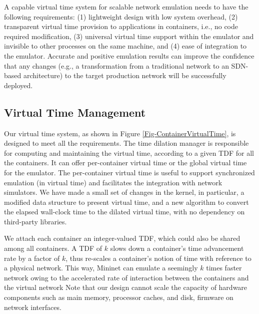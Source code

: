A capable virtual time system for scalable network emulation needs to have the following requirements: (1) lightweight design with low system overhead, (2) transparent virtual time provision to applications in containers, i.e., no code required modification,  (3) universal virtual time support within the emulator and invisible to other processes on the same machine, and (4) ease of integration to the emulator. Accurate and positive emulation results can improve the confidence that any changes (e.g., a transformation from a traditional network to an SDN-based architecture) to the target production network will be successfully deployed. 

\begin{figure*}
\centering
{}
\caption{\textbf{Architecture of the Virtual Time System in a Container-based Network Emulator. Note that a typical container-based network emulator can be presented by this figure without the Virtual Time Middleware.}}
\label{Fig-ContainerVirtualTime}
\end{figure*}

\subsection{Virtual Time Management}
Our virtual time system, as shown in Figure \ref{Fig-ContainerVirtualTime}, is designed to meet all the requirements. The time dilation manager is responsible for computing and maintaining the virtual time, according to a given TDF for all the containers. It can offer per-container virtual time or the global virtual time for the emulator. The per-container virtual time is useful to support synchronized emulation (in virtual time) and facilitates the integration with network simulators. We have made a small set of changes in the kernel, in particular, a modified data structure to present virtual time, and a new algorithm to convert the elapsed wall-clock time to the dilated virtual time, with no dependency on third-party libraries.

We attach each container an integer-valued TDF, which could also be shared among all containers. A TDF of $k$ slows down a container's time advancement rate by a factor of $k$, thus re-scales a container's notion of time with reference to a physical network. This way, Mininet can emulate a seemingly $k$ times faster network owing to the accelerated rate of interaction between the containers and the virtual network
Note that our design cannot scale the capacity of hardware components such as main memory, processor caches, and disk, firmware on network interfaces. 

